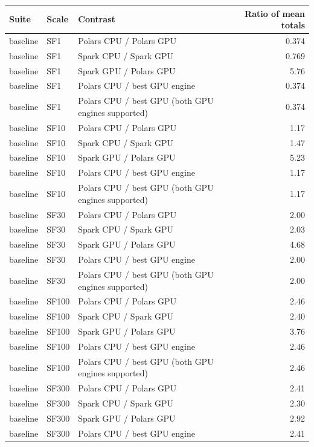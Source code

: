 \begin{tabular}{lllr}
\toprule
Suite & Scale & Contrast & Ratio of mean totals \\
\midrule
baseline & SF1 & Polars CPU / Polars GPU & 0.374 \\
baseline & SF1 & Spark CPU / Spark GPU & 0.769 \\
baseline & SF1 & Spark GPU / Polars GPU & 5.76 \\
baseline & SF1 & Polars CPU / best GPU engine & 0.374 \\
baseline & SF1 & Polars CPU / best GPU (both GPU engines supported) & 0.374 \\
baseline & SF10 & Polars CPU / Polars GPU & 1.17 \\
baseline & SF10 & Spark CPU / Spark GPU & 1.47 \\
baseline & SF10 & Spark GPU / Polars GPU & 5.23 \\
baseline & SF10 & Polars CPU / best GPU engine & 1.17 \\
baseline & SF10 & Polars CPU / best GPU (both GPU engines supported) & 1.17 \\
baseline & SF30 & Polars CPU / Polars GPU & 2.00 \\
baseline & SF30 & Spark CPU / Spark GPU & 2.03 \\
baseline & SF30 & Spark GPU / Polars GPU & 4.68 \\
baseline & SF30 & Polars CPU / best GPU engine & 2.00 \\
baseline & SF30 & Polars CPU / best GPU (both GPU engines supported) & 2.00 \\
baseline & SF100 & Polars CPU / Polars GPU & 2.46 \\
baseline & SF100 & Spark CPU / Spark GPU & 2.40 \\
baseline & SF100 & Spark GPU / Polars GPU & 3.76 \\
baseline & SF100 & Polars CPU / best GPU engine & 2.46 \\
baseline & SF100 & Polars CPU / best GPU (both GPU engines supported) & 2.46 \\
baseline & SF300 & Polars CPU / Polars GPU & 2.41 \\
baseline & SF300 & Spark CPU / Spark GPU & 2.30 \\
baseline & SF300 & Spark GPU / Polars GPU & 2.92 \\
baseline & SF300 & Polars CPU / best GPU engine & 2.41 \\

\end{tabular}
